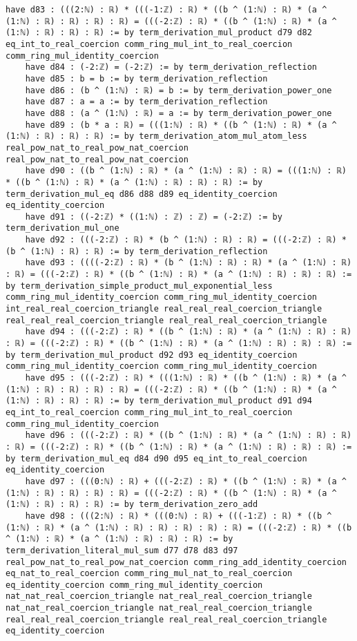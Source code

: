 \documentclass{article}
\begin{document}
\begin{tcolorbox}[colback=white!10, width=\linewidth]
\begin{lstlisting}[language=Lean4]
    have d83 : (((2:ℕ) : ℝ) * (((-1:ℤ) : ℝ) * ((b ^ (1:ℕ) : ℝ) * (a ^ (1:ℕ) : ℝ) : ℝ) : ℝ) : ℝ) = (((-2:ℤ) : ℝ) * ((b ^ (1:ℕ) : ℝ) * (a ^ (1:ℕ) : ℝ) : ℝ) : ℝ) := by term_derivation_mul_product d79 d82 eq_int_to_real_coercion comm_ring_mul_int_to_real_coercion comm_ring_mul_identity_coercion
    have d84 : (-2:ℤ) = (-2:ℤ) := by term_derivation_reflection
    have d85 : b = b := by term_derivation_reflection
    have d86 : (b ^ (1:ℕ) : ℝ) = b := by term_derivation_power_one
    have d87 : a = a := by term_derivation_reflection
    have d88 : (a ^ (1:ℕ) : ℝ) = a := by term_derivation_power_one
    have d89 : (b * a : ℝ) = (((1:ℕ) : ℝ) * ((b ^ (1:ℕ) : ℝ) * (a ^ (1:ℕ) : ℝ) : ℝ) : ℝ) := by term_derivation_atom_mul_atom_less real_pow_nat_to_real_pow_nat_coercion real_pow_nat_to_real_pow_nat_coercion
    have d90 : ((b ^ (1:ℕ) : ℝ) * (a ^ (1:ℕ) : ℝ) : ℝ) = (((1:ℕ) : ℝ) * ((b ^ (1:ℕ) : ℝ) * (a ^ (1:ℕ) : ℝ) : ℝ) : ℝ) := by term_derivation_mul_eq d86 d88 d89 eq_identity_coercion eq_identity_coercion
    have d91 : ((-2:ℤ) * ((1:ℕ) : ℤ) : ℤ) = (-2:ℤ) := by term_derivation_mul_one
    have d92 : (((-2:ℤ) : ℝ) * (b ^ (1:ℕ) : ℝ) : ℝ) = (((-2:ℤ) : ℝ) * (b ^ (1:ℕ) : ℝ) : ℝ) := by term_derivation_reflection
    have d93 : ((((-2:ℤ) : ℝ) * (b ^ (1:ℕ) : ℝ) : ℝ) * (a ^ (1:ℕ) : ℝ) : ℝ) = (((-2:ℤ) : ℝ) * ((b ^ (1:ℕ) : ℝ) * (a ^ (1:ℕ) : ℝ) : ℝ) : ℝ) := by term_derivation_simple_product_mul_exponential_less comm_ring_mul_identity_coercion comm_ring_mul_identity_coercion int_real_real_coercion_triangle real_real_real_coercion_triangle real_real_real_coercion_triangle real_real_real_coercion_triangle
    have d94 : (((-2:ℤ) : ℝ) * ((b ^ (1:ℕ) : ℝ) * (a ^ (1:ℕ) : ℝ) : ℝ) : ℝ) = (((-2:ℤ) : ℝ) * ((b ^ (1:ℕ) : ℝ) * (a ^ (1:ℕ) : ℝ) : ℝ) : ℝ) := by term_derivation_mul_product d92 d93 eq_identity_coercion comm_ring_mul_identity_coercion comm_ring_mul_identity_coercion
    have d95 : (((-2:ℤ) : ℝ) * (((1:ℕ) : ℝ) * ((b ^ (1:ℕ) : ℝ) * (a ^ (1:ℕ) : ℝ) : ℝ) : ℝ) : ℝ) = (((-2:ℤ) : ℝ) * ((b ^ (1:ℕ) : ℝ) * (a ^ (1:ℕ) : ℝ) : ℝ) : ℝ) := by term_derivation_mul_product d91 d94 eq_int_to_real_coercion comm_ring_mul_int_to_real_coercion comm_ring_mul_identity_coercion
    have d96 : (((-2:ℤ) : ℝ) * ((b ^ (1:ℕ) : ℝ) * (a ^ (1:ℕ) : ℝ) : ℝ) : ℝ) = (((-2:ℤ) : ℝ) * ((b ^ (1:ℕ) : ℝ) * (a ^ (1:ℕ) : ℝ) : ℝ) : ℝ) := by term_derivation_mul_eq d84 d90 d95 eq_int_to_real_coercion eq_identity_coercion
    have d97 : (((0:ℕ) : ℝ) + (((-2:ℤ) : ℝ) * ((b ^ (1:ℕ) : ℝ) * (a ^ (1:ℕ) : ℝ) : ℝ) : ℝ) : ℝ) = (((-2:ℤ) : ℝ) * ((b ^ (1:ℕ) : ℝ) * (a ^ (1:ℕ) : ℝ) : ℝ) : ℝ) := by term_derivation_zero_add
    have d98 : (((2:ℕ) : ℝ) * (((0:ℕ) : ℝ) + (((-1:ℤ) : ℝ) * ((b ^ (1:ℕ) : ℝ) * (a ^ (1:ℕ) : ℝ) : ℝ) : ℝ) : ℝ) : ℝ) = (((-2:ℤ) : ℝ) * ((b ^ (1:ℕ) : ℝ) * (a ^ (1:ℕ) : ℝ) : ℝ) : ℝ) := by term_derivation_literal_mul_sum d77 d78 d83 d97 real_pow_nat_to_real_pow_nat_coercion comm_ring_add_identity_coercion eq_nat_to_real_coercion comm_ring_mul_nat_to_real_coercion eq_identity_coercion comm_ring_mul_identity_coercion nat_nat_real_coercion_triangle nat_real_real_coercion_triangle nat_nat_real_coercion_triangle nat_real_real_coercion_triangle real_real_real_coercion_triangle real_real_real_coercion_triangle eq_identity_coercion

\end{lstlisting}
\end{tcolorbox}
\end{document}
